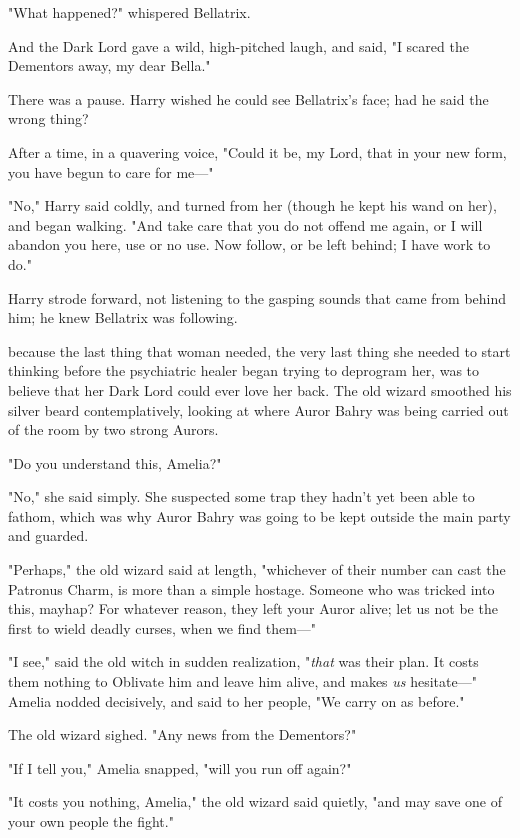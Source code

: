 "What happened?" whispered Bellatrix.

And the Dark Lord gave a wild, high-pitched laugh, and said, "I scared the
Dementors away, my dear Bella."

There was a pause. Harry wished he could see Bellatrix's face; had he said the
wrong thing?

After a time, in a quavering voice, "Could it be, my Lord, that in your new
form, you have begun to care for me—"

"No," Harry said coldly, and turned from her (though he kept his wand on her),
and began walking. "And take care that you do not offend me again, or I will
abandon you here, use or no use. Now follow, or be left behind; I have work to
do."

Harry strode forward, not listening to the gasping sounds that came from behind
him; he knew Bellatrix was following.

{\el} because the last thing that woman needed, the very last thing she
needed to start thinking before the psychiatric healer began trying to
deprogram her, was to believe that her Dark Lord could ever love her back.
\sbreak
The old wizard smoothed his silver beard contemplatively, looking at where
Auror Bahry was being carried out of the room by two strong Aurors.

"Do you understand this, Amelia?"

"No," she said simply. She suspected some trap they hadn't yet been able to
fathom, which was why Auror Bahry was going to be kept outside the main party
and guarded.

"Perhaps," the old wizard said at length, "whichever of their number can cast
the Patronus Charm, is more than a simple hostage. Someone who was tricked into
this, mayhap? For whatever reason, they left your Auror alive; let us not be
the first to wield deadly curses, when we find them—"

"I see," said the old witch in sudden realization, "\emph{that} was their plan.
It costs them nothing to Oblivate him and leave him alive, and makes \emph{us}
hesitate—" Amelia nodded decisively, and said to her people, "We carry on as
before."

The old wizard sighed. "Any news from the Dementors?"

"If I tell you," Amelia snapped, "will you run off again?"

"It costs you nothing, Amelia," the old wizard said quietly, "and may save one
of your own people the fight."

